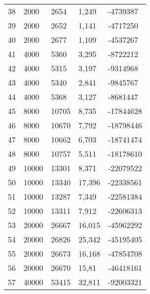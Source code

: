 \begin{longtable}{lllll}
    38               & 2000           & 2654           & 1,249       & -4739387        \\
    39               & 2000           & 2652           & 1,141       & -4717250        \\
    40               & 2000           & 2677           & 1,109       & -4537267        \\
    41               & 4000           & 5360           & 3,295       & -8722212        \\
    42               & 4000           & 5315           & 3,197       & -9314968        \\
    43               & 4000           & 5340           & 2,841       & -9845767        \\
    44               & 4000           & 5368           & 3,127       & -8681447        \\
    45               & 8000           & 10705          & 8,735       & -17844628       \\
    46               & 8000           & 10670          & 7,792       & -18798446       \\
    47               & 8000           & 10662          & 6,703       & -18741474       \\
    48               & 8000           & 10757          & 5,511       & -18178610       \\
    49               & 10000          & 13301          & 8,371       & -22079522       \\
    50               & 10000          & 13340          & 17,396      & -22338561       \\
    51               & 10000          & 13287          & 7,349       & -22581384       \\
    52               & 10000          & 13311          & 7,912       & -22606313       \\
    53               & 20000          & 26667          & 16,015      & -45962292       \\
    54               & 20000          & 26826          & 25,342      & -45195405       \\
    55               & 20000          & 26673          & 16,168      & -47854708       \\
    56               & 20000          & 26670          & 15,81       & -46418161       \\
    57               & 40000          & 53415          & 32,811      & -92003321       \\

\end{longtable}
